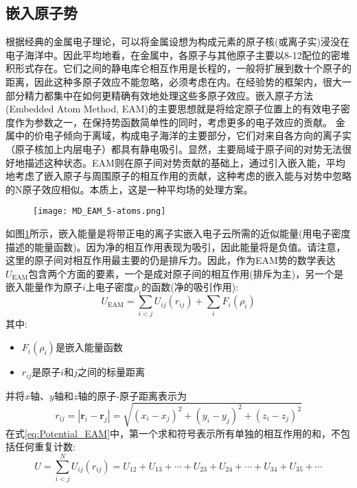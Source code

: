 \subsection{嵌入原子势}
根据经典的金属电子理论，可以将金属设想为构成元素的原子核(或离子实)浸没在电子海洋中。因此平均地看，在金属中，各原子与其他原子主要以8-12配位的密堆积形式存在。它们之间的静电库仑相互作用是长程的，一般将扩展到数十个原子的距离，因此这种多原子效应不能忽略，必须考虑在内。在经验势的框架内，很大一部分精力都集中在如何更精确有效地处理这些多原子效应。嵌入原子方法\textrm{(Embedded Atom Method, EAM)}的主要思想就是将给定原子位置上的有效电子密度作为参数之一，在保持势函数简单性的同时，考虑更多的电子效应的贡献。
金属中的价电子倾向于离域，构成电子海洋的主要部分，它们对来自各方向的离子实（原子核加上内层电子）都具有静电吸引。显然，主要局域于原子间的对势无法很好地描述这种状态。\textrm{EAM}则在原子间对势贡献的基础上，通过引入嵌入能，平均地考虑了嵌入原子与周围原子的相互作用的贡献\cite{PRB29-6443_1984,MSR9-251_1993}，这种考虑的嵌入能与对势中忽略的N原子效应相似。本质上，这是一种平均场的处理方案。
\begin{figure}[h!]
\centering
\vspace*{-0.1in}
\texttt{[image: MD\_EAM\_5-atoms.png]}
\caption{\fontsize{7.2pt}{4.2pt}}%
\label{EAM_atoms}
\end{figure}
如图\ref{EAM_atoms}所示，嵌入能量是将带正电的离子实嵌入电子云所需的近似能量(用电子密度描述的能量函数)。因为净的相互作用表现为吸引，因此能量将是负值。请注意，这里的原子间对相互作用最主要的仍是排斥力。因此，作为\textrm{EAM}势的数学表达$U_{\mathrm{EAM}}$包含两个方面的要素，一个是成对原子间的相互作用(排斥为主)，另一个是嵌入能量作为原子$i$上电子密度$\rho_i$的函数(净的吸引作用):
\begin{equation}
	U_{\mathrm{EAM}}=\sum_{i<j}U_{ij}(r_{ij})+\sum_iF_i(\rho_i)
	\label{eq:Potential_EAM}
\end{equation}
其中:
\begin{itemize}
	\item $F_i(\rho_i)$是嵌入能量函数
	\item $r_{ij}$是原子$i$和$j$之间的标量距离
\end{itemize}
并将$x$轴、$y$轴和$z$轴的原子-原子距离表示为
\begin{equation}
	r_{ij}=|\mathbf{r}_i-\mathbf{r}_j|=\sqrt{(x_i-x_j)^2+(y_i-y_j)^2+(z_i-z_j)^2}
	\label{eq:MD-R_ij}
\end{equation}
在式\eqref{eq:Potential_EAM}中，第一个求和符号表示所有单独的相互作用的和，不包括任何重复计数:
\begin{equation}
	U=\sum_{i<j}^NU_{ij}(r_{ij})=U_{12}+U_{13}+\cdots+U_{23}+U_{24}+\cdots+U_{34}+U_{35}+\cdots
	\label{eq:EAM_pair}
\end{equation}

